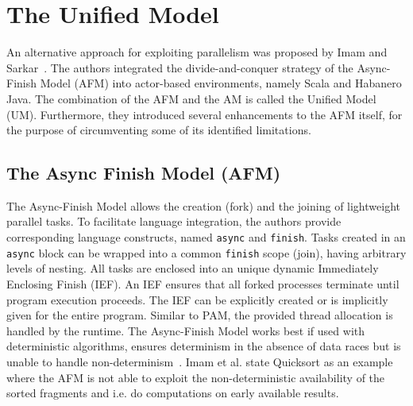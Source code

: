\documentclass[11pt, journal]{IEEEtran}
\newcommand{\ct}{\lstinline[backgroundcolor=\color{white},basicstyle=\footnotesize\ttfamily]}
\begin{document}
\section{The Unified Model}\label{sec:unifiedmodel}
An alternative approach for exploiting parallelism was proposed by Imam and Sarkar~\cite{Imam:2012:ITP:2384616.2384671}. The authors integrated the divide-and-conquer strategy of the Async-Finish Model (AFM) into actor-based environments, namely Scala and Habanero Java. The combination of the AFM and the AM is called the Unified Model (UM). Furthermore, they introduced several enhancements to the AFM itself, for the purpose of circumventing some of its identified limitations.

\subsection{The Async Finish Model (AFM)}\label{subsec:afm}
The Async-Finish Model allows the creation (fork) and the joining of lightweight parallel tasks. To facilitate language integration, the authors provide corresponding language constructs, named \ct{async} and \ct{finish}. Tasks created in an \ct{async} block can be wrapped into a common \ct{finish} scope (join), having arbitrary levels of nesting. All tasks are enclosed into an unique dynamic Immediately Enclosing Finish (IEF). An IEF ensures that all forked processes terminate until program execution proceeds. The IEF can be explicitly created or is implicitly given for the entire program. Similar to PAM, the provided thread allocation is handled by the runtime. The Async-Finish Model works best if used with deterministic algorithms, ensures determinism in the absence of data races but is unable to handle non-determinism~\cite{Imam:2012:ITP:2384616.2384671}. Imam et al. state Quicksort as an example where the AFM is not able to exploit the non-deterministic availability of the sorted fragments and i.e. do computations on early available results. 
\end{document}
